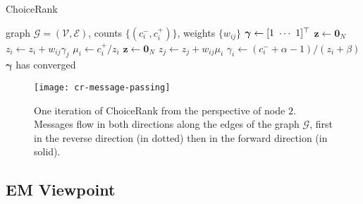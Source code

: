 \begin{algorithm}
  \caption{ChoiceRank}
  \label{cr:alg:choicerank}
  \begin{algorithmic}[1]
    \Require graph $\mathcal{G} = (\mathcal{V}, \mathcal{E})$, counts $\{ (c^-_i, c^+_i) \}$, weights $\{ w_{ij} \}$
    \State $\bm{\gamma} \gets [1 \ \cdots \ 1]^\Tr$
    \Repeat
      \State $\bm{z} \gets \bm{0}_N$
       $z_i \gets z_i + w_{ij} \gamma_j$ \label{cr:line:msg1}
       $\mu_i \gets c^+_i / z_i$
      \State $\bm{z} \gets \bm{0}_N$
       $z_j \gets z_j + w_{ij} \mu_i$ \label{cr:line:msg2}
       $\gamma_i \gets (c^-_i + \alpha - 1) / (z_i + \beta)$
    \Until $\bm{\gamma}$ has converged
  \end{algorithmic}
\end{algorithm}

\begin{figure}[t]
  \centering
  \texttt{[image: cr-message-passing]}
  \caption{One iteration of ChoiceRank from the perspective of node $2$.
  Messages flow in both directions along the edges of the graph $\mathcal{G}$, first in the reverse direction (in dotted) then in the forward direction (in solid).}
  \label{cr:fig:msgpassing}
\end{figure}

\subsection{EM Viewpoint}

